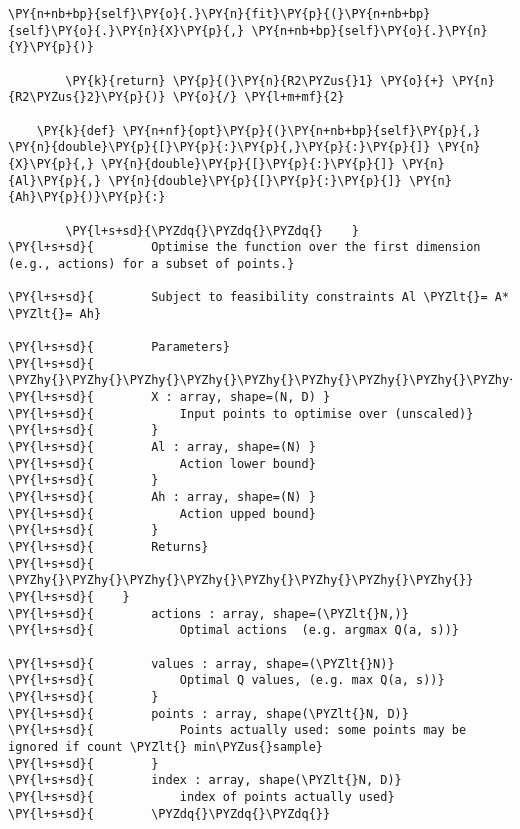 \begin{Verbatim}[commandchars=\\\{\}]
        \PY{n+nb+bp}{self}\PY{o}{.}\PY{n}{fit}\PY{p}{(}\PY{n+nb+bp}{self}\PY{o}{.}\PY{n}{X}\PY{p}{,} \PY{n+nb+bp}{self}\PY{o}{.}\PY{n}{Y}\PY{p}{)}

        \PY{k}{return} \PY{p}{(}\PY{n}{R2\PYZus{}1} \PY{o}{+} \PY{n}{R2\PYZus{}2}\PY{p}{)} \PY{o}{/} \PY{l+m+mf}{2}

    \PY{k}{def} \PY{n+nf}{opt}\PY{p}{(}\PY{n+nb+bp}{self}\PY{p}{,} \PY{n}{double}\PY{p}{[}\PY{p}{:}\PY{p}{,}\PY{p}{:}\PY{p}{]} \PY{n}{X}\PY{p}{,} \PY{n}{double}\PY{p}{[}\PY{p}{:}\PY{p}{]} \PY{n}{Al}\PY{p}{,} \PY{n}{double}\PY{p}{[}\PY{p}{:}\PY{p}{]} \PY{n}{Ah}\PY{p}{)}\PY{p}{:}
        
        \PY{l+s+sd}{\PYZdq{}\PYZdq{}\PYZdq{}    }
\PY{l+s+sd}{        Optimise the function over the first dimension (e.g., actions) for a subset of points.}

\PY{l+s+sd}{        Subject to feasibility constraints Al \PYZlt{}= A* \PYZlt{}= Ah}

\PY{l+s+sd}{        Parameters}
\PY{l+s+sd}{        \PYZhy{}\PYZhy{}\PYZhy{}\PYZhy{}\PYZhy{}\PYZhy{}\PYZhy{}\PYZhy{}\PYZhy{}\PYZhy{}\PYZhy{}}
\PY{l+s+sd}{        X : array, shape=(N, D) }
\PY{l+s+sd}{            Input points to optimise over (unscaled)}
\PY{l+s+sd}{        }
\PY{l+s+sd}{        Al : array, shape=(N) }
\PY{l+s+sd}{            Action lower bound}
\PY{l+s+sd}{        }
\PY{l+s+sd}{        Ah : array, shape=(N) }
\PY{l+s+sd}{            Action upped bound}
\PY{l+s+sd}{        }
\PY{l+s+sd}{        Returns}
\PY{l+s+sd}{        \PYZhy{}\PYZhy{}\PYZhy{}\PYZhy{}\PYZhy{}\PYZhy{}\PYZhy{}\PYZhy{}}
\PY{l+s+sd}{    }
\PY{l+s+sd}{        actions : array, shape=(\PYZlt{}N,)}
\PY{l+s+sd}{            Optimal actions  (e.g. argmax Q(a, s))}

\PY{l+s+sd}{        values : array, shape=(\PYZlt{}N)}
\PY{l+s+sd}{            Optimal Q values, (e.g. max Q(a, s))}
\PY{l+s+sd}{        }
\PY{l+s+sd}{        points : array, shape(\PYZlt{}N, D)}
\PY{l+s+sd}{            Points actually used: some points may be ignored if count \PYZlt{} min\PYZus{}sample}
\PY{l+s+sd}{        }
\PY{l+s+sd}{        index : array, shape(\PYZlt{}N, D)}
\PY{l+s+sd}{            index of points actually used}
\PY{l+s+sd}{        \PYZdq{}\PYZdq{}\PYZdq{}}
        

\end{Verbatim}
